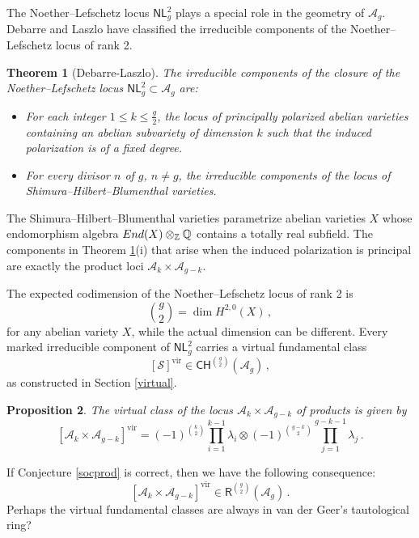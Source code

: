 \documentclass[11pt]{amsart}
\newtheorem{thm}{Theorem}
\newtheorem{prop}[thm]{Proposition}
\theoremstyle{definition}
\newcommand{\A}{\mathcal{A}}
\newcommand{\CH}{\mathsf{CH}}
\begin{document}
{The  
Noether--Lefschetz locus 
$\mathsf{NL}^2_g$
plays a special
role in the geometry of $\mathcal{A}_{g}$.
Debarre and Laszlo \cite{DL} have classified  the irreducible components of the Noether--Lefschetz locus
of rank 2. 
\begin{thm}[Debarre-Laszlo] \label{DebLaz} The irreducible components of the closure of the Noether--Lefschetz locus 
$\mathsf{NL}_g^2 \subset \mathcal{A}_g$ are:
\begin{itemize}
    \item[\textnormal{(i)}] For each integer $1\leq k\leq \frac{g}{2}$, the locus of principally polarized abelian varieties containing an abelian subvariety of dimension $k$ such that the induced polarization is of a fixed degree.
    \item[\textnormal{(ii)}] For every divisor $n$ of $g$, $n\neq g$, the irreducible components of the locus of Shimura--Hilbert--Blumenthal varieties. 
\end{itemize}
\end{thm}

The Shimura--Hilbert--Blumenthal varieties parametrize abelian varieties $X$ whose endomorphism algebra $\textnormal{End}(X)\otimes_{\mathbb Z} \mathbb Q$ contains a totally real subfield. The components in Theorem \ref{DebLaz}(i) that arise when the induced polarization is principal are exactly the product loci $\A_k\times \A_{g-k}$. 

The expected codimension of the Noether--Lefschetz locus
of rank 2 is $$\binom{g}{2}=\dim H^{2,0}(X)\, ,$$
for any abelian variety $X$, while the actual dimension can be different. Every marked irreducible component of 
$\mathsf{NL}^2_g$ carries a virtual fundamental class
$$[\mathcal{S}]^{\mathrm{vir}} \in  \CH^{\binom{g}{2}}(\A_g)\, ,$$
as constructed in Section \ref{virtual}.


\begin{prop}\label{vclass}
    The virtual class of the locus $\A_k\times \A_{g-k}$ of products is given by
    \[
    [\A_k\times \A_{g-k}]^{\mathrm{vir}}=(-1)^{\binom{k}{2}}\prod_{i=1}^{k-1}\lambda_i\otimes (-1)^{\binom{g-k}{2}}\prod_{j=1}^{g-k-1}\lambda_j\,.
    \]
\end{prop}

If Conjecture \ref{socprod} is correct, then we have the
following consequence:
$$  [\A_k\times \A_{g-k}]^{\mathrm{vir}} \in  \mathsf{R}^{\binom{g}{2}}(\A_g)\, . $$
Perhaps the virtual fundamental classes are always in van der Geer's
tautological ring?

}
\end{document}
